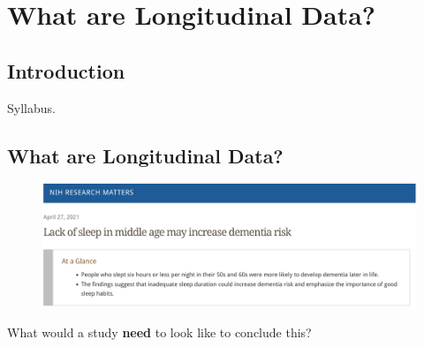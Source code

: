 \chapter{What are Longitudinal Data?}
\section{Introduction}
Syllabus.
\section{What are Longitudinal Data?}
\begin{figure}[H]
    \centering
    \includegraphics[width=\textwidth]{figures/002-study.pdf}
\end{figure}
What would a study \textbf{need} to look like to conclude this?
